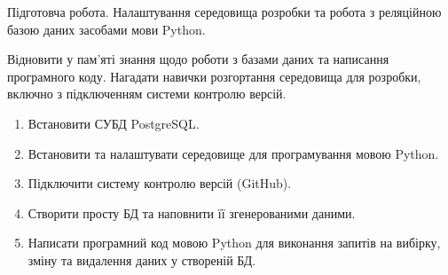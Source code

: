 


 Підготовча робота. Налаштування середовища розробки та робота з реляційною базою даних засобами мови Python.

 Відновити у пам'яті знання щодо роботи з базами даних та написання програмного коду. Нагадати навички розгортання середовища для розробки, включно з підключенням системи контролю версій.

\begin{enumerate}
  \item Встановити СУБД PostgreSQL.
  \item Встановити та налаштувати середовище для програмування мовою Python.
  \item Підключити систему контролю версій (GitHub).
  \item Створити просту БД та наповнити її згенерованими даними.
  \item Написати програмний код мовою Python для виконання запитів на вибірку, зміну та видалення даних у створеній БД.
\end{enumerate}

